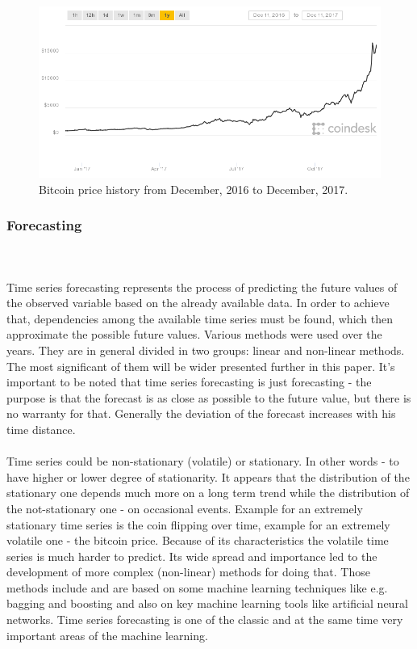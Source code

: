 \documentclass[runningheads,a4paper]{llncs}[2015/06/24]
\begin{document}
\begin{figure}[h]
\centering
\includegraphics[width=\textwidth]{bitcoin}
\caption{Bitcoin price history from December,  2016 to December, 2017.}
\label{fig:bitcoin}
\end{figure}

		\subsubsection{Forecasting} \hspace{1cm}\\\\Time series forecasting represents the process of predicting the future values of the observed variable based on the already available data. In order to achieve that, dependencies among the available time series must be found, which then approximate the possible future values. Various methods were used over the years. They are in general divided  in two groups: linear and non-linear methods. The most significant of them will be wider presented  further in this paper. It's important to be noted that time series forecasting is just forecasting - the purpose is that the forecast is as close as possible to the future value, but there is no warranty for that. Generally the deviation of the forecast increases with his time distance.\\\\ Time series could be non-stationary (volatile) or stationary. In other words - to have higher or lower degree of stationarity. It appears that the distribution of the stationary one depends much more on a long term trend while the distribution of the not-stationary one - on occasional events. Example for an extremely stationary time series is the coin flipping over time, example for an extremely volatile one - the bitcoin price. Because of its characteristics the volatile time series is much harder to predict. Its wide spread and importance led to the development of more complex (non-linear) methods for doing that. Those methods include and are based on some machine learning techniques like e.g. bagging and boosting and also on key machine learning tools like artificial neural networks. Time series forecasting is one of the classic and at the same time very important areas of the machine learning.
\end{document}
